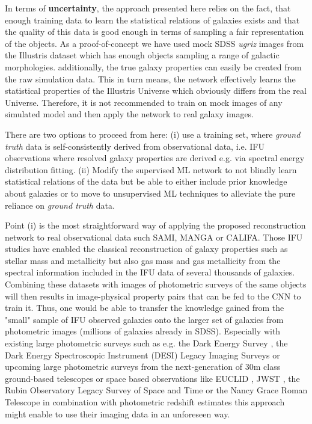 \documentclass[useAMS,usenatbib]{mnras}
\begin{document}
In terms of \textbf{uncertainty}, the approach presented here relies on the fact, that enough training data to learn the statistical relations of galaxies exists and that the quality of this data is good enough in terms of sampling a fair representation of the objects. As a proof-of-concept we have used mock SDSS \emph{ugriz} images from the Illustris dataset which has enough objects sampling a range of galactic morphologies. additionally, the true galaxy properties can easily be created from the raw simulation data. This in turn means, the network effectively learns the statistical properties of the Illustris Universe which obviously differs from the real Universe. Therefore, it is not recommended to train on mock images of any simulated model and then apply the network to real galaxy images.

There are two options to proceed from here: (i) use a training set, where \emph{ground truth} data is self-consistently derived from observational data, i.e. IFU observations where resolved galaxy properties are derived e.g. via spectral energy distribution fitting. (ii) Modify the supervised ML network to not blindly learn statistical relations of the data but be able to either include prior knowledge about galaxies or to move to unsupervised ML techniques to alleviate the pure reliance on \emph{ground truth} data.
 
Point (i) is the most straightforward way of applying the proposed reconstruction network to real observational data such SAMI, MANGA or CALIFA. Those IFU studies have enabled the classical reconstruction of galaxy properties such as stellar mass and metallicity but also gas mass and gas metallicity from the spectral information included in the  IFU data of several thousands of galaxies. Combining these datasets with images of photometric surveys of the same objects will then results in image-physical property pairs that can be fed to the CNN to train it. Thus, one would be able to transfer the knowledge gained from the "small" sample of IFU observed galaxies onto the larger set of galaxies from photometric images (millions of galaxies already in SDSS). Especially with existing large photometric surveys such as e.g. the Dark Energy Survey \citep[DES][]{DES,DES2005}, the Dark Energy Spectroscopic Instrument (DESI) Legacy Imaging Surveys \citep{DESI} or upcoming large photometric surveys from the next-generation of 30m class ground-based telescopes or space based observations like EUCLID \citep{euclid}, JWST \citep{jwst}, the Rubin Observatory Legacy Survey of Space and Time \citep[LSST][]{LSST,LSST2019} or the Nancy Grace Roman Telescope in combination with photometric redshift estimates \citep[e.g.][]{Henghes2021} this approach might enable to use their imaging data in an unforeseen way.  
\end{document}
